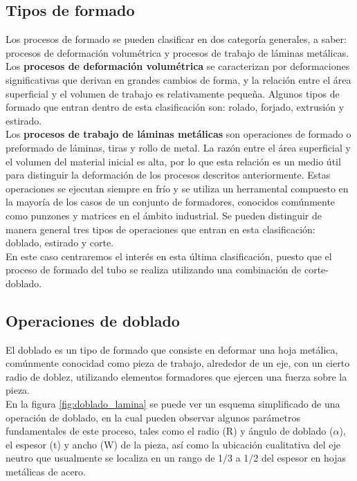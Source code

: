 \subsection{Tipos de formado}

Los procesos de formado se pueden clasificar en dos categoría generales, a saber: procesos de 
deformación volumétrica y procesos de trabajo de láminas metálicas.~\cite{groover2007}\\

Los \textbf{procesos de deformación volumétrica} se caracterizan por deformaciones significativas 
que derivan en grandes cambios de forma, y la relación entre el área superficial y el volumen 
de trabajo es relativamente pequeña. Algunos tipos de formado que entran dentro de esta 
clasificación son: rolado, forjado, extrusión y estirado. ~\cite{groover2007}\\

Los \textbf{procesos de trabajo de láminas metálicas} son operaciones de formado o preformado 
de láminas, tiras y rollo de metal. La razón entre el área superficial y el volumen del material 
inicial es alta, por lo que esta relación es un medio útil para distinguir la deformación 
de los procesos descritos anteriormente. Estas operaciones se ejecutan siempre en frío y 
se utiliza un herramental compuesto en la mayoría de los casos de un conjunto de formadores, 
conocidos comúnmente como punzones y matrices en el ámbito industrial. Se pueden 
distinguir de manera general tres tipos de operaciones que entran en esta clasificación: 
doblado, estirado y corte.~\cite{groover2007}\\

En este caso centraremos el interés en esta última clasificación, puesto que el proceso 
de formado del tubo se realiza utilizando una combinación de corte-doblado.

\subsection{Operaciones de doblado}

El doblado es un tipo de formado que consiste en deformar una hoja metálica, 
comúnmente conocidad como pieza de trabajo, alrededor de un eje, con un cierto 
radio de doblez, utilizando elementos formadores que ejercen una fuerza 
sobre la pieza.\\

En la figura \ref{fig:doblado_lamina} se puede ver un esquema simplificado 
de una operación de doblado, en la cual pueden observar algunos parámetros 
fundamentales de este proceso, tales como el radio (R) y ángulo de doblado 
($\alpha$), el espesor (t) y ancho (W) de la pieza, así como la ubicación 
cualitativa del eje neutro que usualmente se localiza en un rango de 1/3 
a 1/2 del espesor en hojas metálicas de acero.

